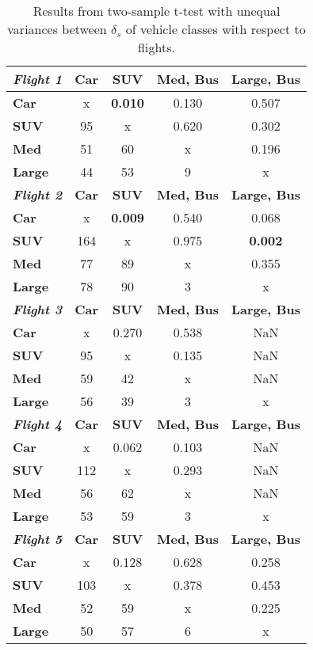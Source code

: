 \documentclass[preprint,12pt,a4paper]{elsarticle}
\begin{document}
\begin{linenumbers}
\begin{table}[H]
\centering
\caption{Results from two-sample t-test with unequal variances between $\delta_{s}$ of vehicle classes with respect to flights.}
\label{tab:t-vehicles}
\begin{tabular}{@{}lcccc@{}}
\toprule
\textit{\textbf{Flight 1}} & \textbf{Car} & \textbf{SUV} & \textbf{Med, Bus} & \textbf{Large, Bus} \\ \midrule
\textbf{Car} & x & \textbf{0.010} & 0.130 & 0.507 \\
\textbf{SUV} & 95 & x & 0.620 & 0.302 \\
\textbf{Med} & 51 & 60 & x & 0.196 \\
\textbf{Large} & 44 & 53 & 9 & x \\ \midrule
\textit{\textbf{Flight 2}} & \textbf{Car} & \textbf{SUV} & \textbf{Med, Bus} & \textbf{Large, Bus} \\
\textbf{Car} & x & \textbf{0.009} & 0.540 & 0.068 \\
\textbf{SUV} & 164 & x & 0.975 & \textbf{0.002} \\
\textbf{Med} & 77 & 89 & x & 0.355 \\
\textbf{Large} & 78 & 90 & 3 & x \\ \midrule
\textit{\textbf{Flight 3}} & \textbf{Car} & \textbf{SUV} & \textbf{Med, Bus} & \textbf{Large, Bus} \\
\textbf{Car} & x & 0.270 & 0.538 & NaN \\
\textbf{SUV} & 95 & x & 0.135 & NaN \\
\textbf{Med} & 59 & 42 & x & NaN \\
\textbf{Large} & 56 & 39 & 3 & x \\  \midrule
\textit{\textbf{Flight 4}} & \textbf{Car} & \textbf{SUV} & \textbf{Med, Bus} & \textbf{Large, Bus} \\
\textbf{Car} & x & 0.062 & 0.103 & NaN \\
\textbf{SUV} & 112 & x & 0.293 & NaN \\
\textbf{Med} & 56 & 62 & x & NaN \\
\textbf{Large} & 53 & 59 & 3 & x \\  \midrule
\textit{\textbf{Flight 5}} & \textbf{Car} & \textbf{SUV} & \textbf{Med, Bus} & \textbf{Large, Bus} \\
\textbf{Car} & x & 0.128 & 0.628 & 0.258 \\
\textbf{SUV} & 103 & x & 0.378 & 0.453 \\
\textbf{Med} & 52 & 59 & x & 0.225 \\
\textbf{Large} & 50 & 57 & 6 & x \\ \bottomrule
\end{tabular}
\end{table}


\end{linenumbers}
\end{document}

